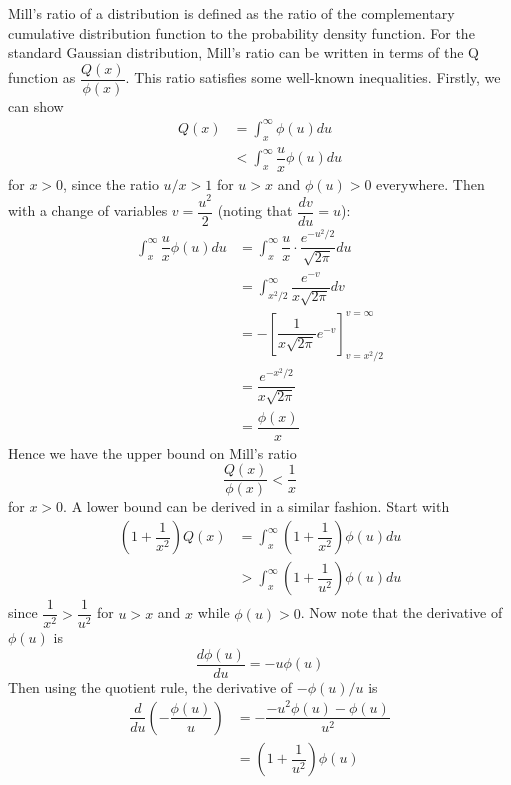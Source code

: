 \documentclass[11pt]{report} %
\begin{document}
Mill's ratio of a distribution is defined as the ratio of the complementary cumulative distribution function to the probability density function. For the standard Gaussian distribution, Mill's ratio can be written in terms of the Q function as $\dfrac{Q\left(x\right)}{\phi\left(x\right)}$. This ratio satisfies some well-known inequalities. Firstly, we can show
\begin{align}
Q\left(x\right) &= \int_{x}^{\infty}\phi\left(u\right)du \\
& < \int_{x}^{\infty}\dfrac{u}{x}\phi\left(u\right)du
\end{align}
for $x > 0$, since the ratio $u/x > 1$ for $u > x$ and $\phi\left(u\right) > 0$ everywhere. Then with a change of variables $v = \dfrac{u^{2}}{2}$ (noting that $\dfrac{dv}{du} = u$):
\begin{align}
\int_{x}^{\infty}\dfrac{u}{x}\phi\left(u\right)du &= \int_{x}^{\infty}\dfrac{u}{x}\cdot \dfrac{e^{-u^{2}/2}}{\sqrt{2\pi}}du \\
&= \int_{x^{2}/2}^{\infty}\dfrac{e^{-v}}{x\sqrt{2\pi}}dv \\
&= -\left[\dfrac{1}{x\sqrt{2\pi}}e^{-v}\right]_{v=x^{2}/2}^{v = \infty} \\
&= \dfrac{e^{-x^{2}/2}}{x\sqrt{2\pi}} \\
&= \dfrac{\phi\left(x\right)}{x}
\end{align}
Hence we have the upper bound on Mill's ratio
\begin{equation}
\dfrac{Q\left(x\right)}{\phi\left(x\right)} < \dfrac{1}{x}
\end{equation}
for $x > 0$. A lower bound can be derived in a similar fashion. Start with
\begin{align}
\left(1 + \dfrac{1}{x^{2}}\right)Q\left(x\right) &= \int_{x}^{\infty}\left(1 + \dfrac{1}{x^{2}}\right)\phi\left(u\right)du \\
&> \int_{x}^{\infty}\left(1 + \dfrac{1}{u^{2}}\right)\phi\left(u\right)du
\end{align}
since $\dfrac{1}{x^{2}} > \dfrac{1}{u^{2}}$ for $u > x$ and $x$ while $\phi\left(u\right) > 0$. Now note that the derivative of $\phi\left(u\right)$ is
\begin{equation}
\dfrac{d\phi\left(u\right)}{du} = -u\phi\left(u\right)
\end{equation}
Then using the quotient rule, the derivative of $-\phi\left(u\right)/u$ is
\begin{align}
\dfrac{d}{du}\left(-\dfrac{\phi\left(u\right)}{u}\right) &= -\dfrac{-u^{2}\phi\left(u\right) - \phi\left(u\right)}{u^{2}} \\
&= \left(1 + \dfrac{1}{u^{2}}\right)\phi\left(u\right)
\end{align}
\end{document}
